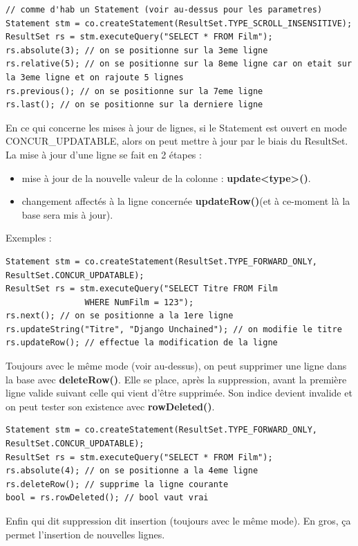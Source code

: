 \documentclass{report}
\begin{document}
\begin{lstlisting}[style=MyJavaStyle]
// comme d'hab un Statement (voir au-dessus pour les parametres)
Statement stm = co.createStatement(ResultSet.TYPE_SCROLL_INSENSITIVE);
ResultSet rs = stm.executeQuery("SELECT * FROM Film");
rs.absolute(3); // on se positionne sur la 3eme ligne
rs.relative(5); // on se positionne sur la 8eme ligne car on etait sur la 3eme ligne et on rajoute 5 lignes
rs.previous(); // on se positionne sur la 7eme ligne
rs.last(); // on se positionne sur la derniere ligne
\end{lstlisting}
En ce qui concerne les mises à jour de lignes, si le Statement est ouvert en mode CONCUR\_UPDATABLE, alors on peut mettre à jour par le biais du ResultSet.\\
La mise à jour d'une ligne se fait en 2 étapes :
\begin{itemize}
\item mise à jour de la nouvelle valeur de la colonne : \textbf{update<type>()}.
\item changement affectés à la ligne concernée \textbf{updateRow()}(et à ce-moment là la base sera mis à jour).\\
\end{itemize}
Exemples :
\begin{lstlisting}[style=MyJavaStyle]
Statement stm = co.createStatement(ResultSet.TYPE_FORWARD_ONLY, ResultSet.CONCUR_UPDATABLE);
ResultSet rs = stm.executeQuery("SELECT Titre FROM Film 
				WHERE NumFilm = 123");
rs.next(); // on se positionne a la 1ere ligne
rs.updateString("Titre", "Django Unchained"); // on modifie le titre
rs.updateRow(); // effectue la modification de la ligne
\end{lstlisting}
Toujours avec le même mode (voir au-dessus), on peut supprimer une ligne dans la base avec \textbf{deleteRow()}. Elle se place, après la suppression, avant la première ligne valide suivant celle qui vient d'être supprimée. Son indice devient invalide et on peut tester son existence avec \textbf{rowDeleted()}.
\begin{lstlisting}[style=MyJavaStyle]
Statement stm = co.createStatement(ResultSet.TYPE_FORWARD_ONLY, ResultSet.CONCUR_UPDATABLE);
ResultSet rs = stm.executeQuery("SELECT * FROM Film");
rs.absolute(4); // on se positionne a la 4eme ligne
rs.deleteRow(); // supprime la ligne courante
bool = rs.rowDeleted(); // bool vaut vrai
\end{lstlisting}
Enfin qui dit suppression dit insertion (toujours avec le même mode). En gros, ça permet l'insertion de nouvelles lignes.\\
\end{document}
